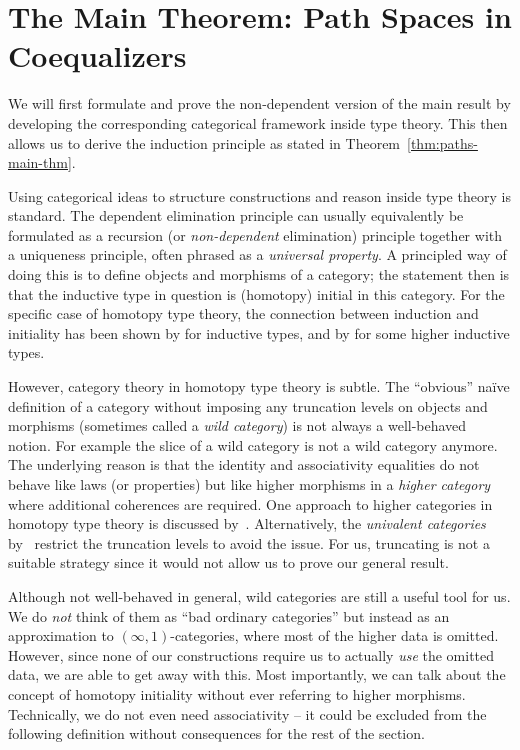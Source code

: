 \section{The Main Theorem: Path Spaces in Coequalizers}\label{sec:paths-main}

We will first formulate and prove the non-dependent version of the main result
by developing the corresponding categorical framework inside type theory.
This then allows us to derive the induction principle as stated in Theorem~\ref{thm:paths-main-thm}.

Using categorical ideas to structure constructions and reason inside type
theory is standard.
The dependent elimination principle can usually equivalently be formulated
as a recursion (or \emph{non-dependent} elimination) principle together
with a uniqueness principle,
often phrased as a \emph{universal property}.
A principled way of doing this is to define objects and morphisms of a
category; the statement then is that the inductive type in question is
(homotopy) initial in this category.
For the specific case of homotopy type theory, the connection between
induction and initiality has been shown by
\cite{awodeyGamSoja_hoAlgs} for inductive types,
and by \cite{DBLP:journals/corr/Sojakova14} for some higher inductive types.

However, category theory in homotopy type theory is subtle.
The ``obvious'' naïve definition of a category without imposing any
truncation levels on objects and morphisms (sometimes called a
\emph{wild category}) is not always a well-behaved notion.
For example the slice of a wild category is not a wild category anymore.
The underlying reason is that the identity and associativity
equalities do not behave like laws (or properties) but like higher morphisms
in a \emph{higher category} where additional coherences are required.
One approach to higher categories in homotopy type theory
is discussed by~\cite{Capriotti2017}.
Alternatively, the \emph{univalent categories} by~\cite{ahrens_rezk}
restrict the truncation levels to avoid the issue.
For us,
truncating is not a suitable strategy since it would not allow us to prove our general result.

Although not well-behaved in general, wild categories are still a useful tool
for us.
We do \emph{not} think of them as ``bad ordinary categories'' but instead
as an approximation to $(\infty,1)$-categories, where most of the
higher data is omitted.
However, since none of our constructions require us to actually \emph{use}
the omitted data, we are able to get away with this.
Most importantly,
we can talk about the concept of homotopy initiality without ever referring
to higher morphisms.
Technically, we do not even need associativity -- it could be excluded from the
following definition without consequences for the rest of the section.

